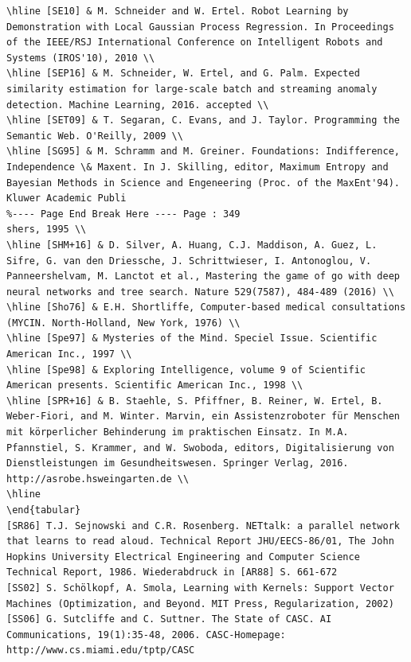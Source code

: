 \documentclass[10pt]{article}
\begin{document}
\begin{verbatim}
\hline [SE10] & M. Schneider and W. Ertel. Robot Learning by Demonstration with Local Gaussian Process Regression. In Proceedings of the IEEE/RSJ International Conference on Intelligent Robots and Systems (IROS'10), 2010 \\
\hline [SEP16] & M. Schneider, W. Ertel, and G. Palm. Expected similarity estimation for large-scale batch and streaming anomaly detection. Machine Learning, 2016. accepted \\
\hline [SET09] & T. Segaran, C. Evans, and J. Taylor. Programming the Semantic Web. O'Reilly, 2009 \\
\hline [SG95] & M. Schramm and M. Greiner. Foundations: Indifference, Independence \& Maxent. In J. Skilling, editor, Maximum Entropy and Bayesian Methods in Science and Engeneering (Proc. of the MaxEnt'94). Kluwer Academic Publi
%---- Page End Break Here ---- Page : 349
shers, 1995 \\
\hline [SHM+16] & D. Silver, A. Huang, C.J. Maddison, A. Guez, L. Sifre, G. van den Driessche, J. Schrittwieser, I. Antonoglou, V. Panneershelvam, M. Lanctot et al., Mastering the game of go with deep neural networks and tree search. Nature 529(7587), 484-489 (2016) \\
\hline [Sho76] & E.H. Shortliffe, Computer-based medical consultations (MYCIN. North-Holland, New York, 1976) \\
\hline [Spe97] & Mysteries of the Mind. Speciel Issue. Scientific American Inc., 1997 \\
\hline [Spe98] & Exploring Intelligence, volume 9 of Scientific American presents. Scientific American Inc., 1998 \\
\hline [SPR+16] & B. Staehle, S. Pfiffner, B. Reiner, W. Ertel, B. Weber-Fiori, and M. Winter. Marvin, ein Assistenzroboter für Menschen mit körperlicher Behinderung im praktischen Einsatz. In M.A. Pfannstiel, S. Krammer, and W. Swoboda, editors, Digitalisierung von Dienstleistungen im Gesundheitswesen. Springer Verlag, 2016. http://asrobe.hsweingarten.de \\
\hline
\end{tabular}
[SR86] T.J. Sejnowski and C.R. Rosenberg. NETtalk: a parallel network that learns to read aloud. Technical Report JHU/EECS-86/01, The John Hopkins University Electrical Engineering and Computer Science Technical Report, 1986. Wiederabdruck in [AR88] S. 661-672
[SS02] S. Schölkopf, A. Smola, Learning with Kernels: Support Vector Machines (Optimization, and Beyond. MIT Press, Regularization, 2002)
[SS06] G. Sutcliffe and C. Suttner. The State of CASC. AI Communications, 19(1):35-48, 2006. CASC-Homepage: http://www.cs.miami.edu/tptp/CASC

\end{verbatim}
\end{document}
